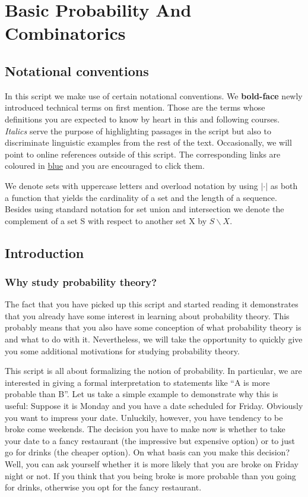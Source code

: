\chapter{Basic Probability And Combinatorics}

\section*{Notational conventions}
In this script we make use of certain notational conventions. We \textbf{bold-face} newly introduced
technical terms on first mention. Those are the terms whose definitions you are expected to know by heart
in this and following courses. \textit{Italics} serve the purpose of highlighting passages in the
script but also to discriminate linguistic examples from the rest of the text. Occasionally, we will
point to online references outside of this script. The corresponding links are coloured in  
\href{http://en.wikibooks.org/wiki/LaTeX/Hyperlinks}{blue} and you are encouraged to click them.

We denote sets with uppercase letters and overload notation by using $ |\cdot| $ as both a function
that yields the cardinality of a set and the length of a sequence. Besides using standard notation
for set union and intersection we denote the complement of a set S with respect to another set X by
$ S\backslash X $.

\section{Introduction}
\subsection{Why study probability theory?}
The fact that you have picked up this script and started reading it demonstrates that you already have
some interest in learning about probability theory. This probably means that you also have some conception
of what probability theory is and what to do with it. Nevertheless, we will take the opportunity to
quickly give you some additional motivations for studying probability theory.

This script is all about formalizing the notion of probability. In particular, we are interested in 
giving a formal interpretation to statements like ``A is more probable than B''. Let us take a simple
example to demonstrate why this is useful: Suppose it is Monday and you have a date scheduled for
Friday. Obviously you want to impress your date. Unluckily, however, you have tendency to be broke
come weekends. The decision you have to make now is whether to take your date to a fancy restaurant
(the impressive but expensive option) or to just go for drinks (the cheaper option). On what basis can
you make this decision? Well, you can ask yourself whether it is more likely that you are broke on 
Friday night or not. If you think that you being broke is more probable than you going for drinks, otherwise
you opt for the fancy restaurant.


